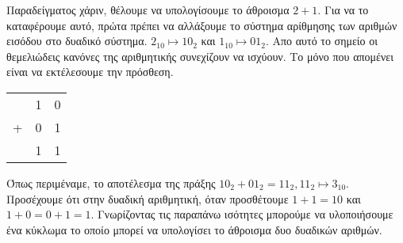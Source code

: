 Παραδείγματος χάριν, θέλουμε να υπολογίσουμε το άθροισμα $2 + 1$. Για να το καταφέρουμε
αυτό, πρώτα πρέπει να αλλάξουμε το σύστημα αρίθμησης των αριθμών εισόδου στο δυαδικό σύστημα.
$2_{10}\mapsto10_2$ και $1_{10}\mapsto01_2$. Απο αυτό το σημείο οι θεμελιώδεις κανόνες
της αριθμητικής συνεχίζουν να ισχύουν. Το μόνο που απομένει είναι να εκτέλεσουμε την πρόσθεση.
\begin{center}
    \begin{tabular}{c@{\,}c@{\,}c}
        & 1 & 0 \\
      + & 0 & 1 \\
      \hline
        & 1 & 1 \\
      \end{tabular}
\end{center}
Όπως περιμέναμε, το αποτέλεσμα της πράξης $10_2 + 01_2 = 11_2, 11_2 \mapsto 3_{10}$.
Προσέχουμε ότι στην δυαδική αριθμητική, όταν προσθέτουμε $1 + 1 = 10$ και $1 + 0 = 0 + 1 = 1$.
Γνωρίζοντας τις παραπάνω ισότητες μπορούμε να υλοποιήσουμε ένα κύκλωμα το οποίο μπορεί
να υπολογίσει το άθροισμα δυο δυαδικών αριθμών.